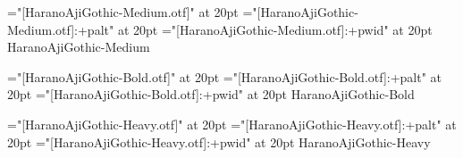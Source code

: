 \test
\vfil
\eject

\font\fnone="[HaranoAjiGothic-Medium.otf]" at 20pt
\font\fpalt="[HaranoAjiGothic-Medium.otf]:+palt" at 20pt
\font\fpwid="[HaranoAjiGothic-Medium.otf]:+pwid" at 20pt
\fnone HaranoAjiGothic-Medium

\test
\vfil
\eject

\font\fnone="[HaranoAjiGothic-Bold.otf]" at 20pt
\font\fpalt="[HaranoAjiGothic-Bold.otf]:+palt" at 20pt
\font\fpwid="[HaranoAjiGothic-Bold.otf]:+pwid" at 20pt
\fnone HaranoAjiGothic-Bold

\test
\vfil
\eject

\font\fnone="[HaranoAjiGothic-Heavy.otf]" at 20pt
\font\fpalt="[HaranoAjiGothic-Heavy.otf]:+palt" at 20pt
\font\fpwid="[HaranoAjiGothic-Heavy.otf]:+pwid" at 20pt
\fnone HaranoAjiGothic-Heavy

\test
\vfil
\eject

\bye

